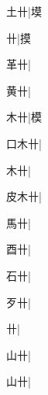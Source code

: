 \begin{multicols}{2}
{{\cjk{}{\cnsym{}　}土卄}|{\cjk{}塻}\par
{卄}|{\cjk{}摸}\par
{\cjk{}{\cnsym{}　}革卄}|{}\par
{\cjk{}{\cnsym{}　}黄卄}|{}\par
{\cjk{}{\cnsym{}　}木卄}|{\cjk{}模}\par
{\cjk{}口木卄}|{}\par
{木卄}|{}\par
{\cjk{}皮木卄}|{}\par
{\cjk{}{\cnsym{}　}馬卄}|{}\par
{\cjk{}{\cnsym{}　}酉卄}|{}\par
{\cjk{}{\cnsym{}　}石卄}|{}\par
{\cjk{}{\cnsym{}　}歹卄}|{}\par
{卄}|{}\par
{\cjk{}{\cnsym{}　}山卄}|{}\par
{山卄}|{}\par
}
\end{multicols}
